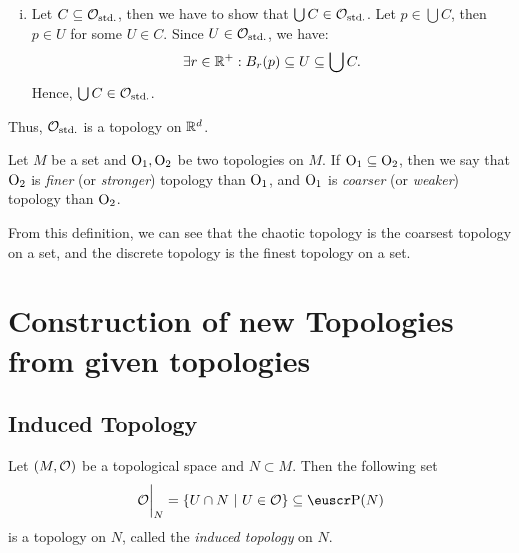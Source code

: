 \begin{example}
\begin{enumerate}[(i)]
		\item Let \(C \subseteq \mathcal{O}_{\text{std.}}\), then we have to show that \(\bigcup C\in\mathcal{O}_{\text{std.}}\). Let \(p \in \bigcup C\), then \(p \in U\) for some \(U \in C\). Since \(U \in \mathcal{O}_{\text{std.}}\), we have:
		      \begin{equation*}
			      \exists r \in \mathbb R^+ : B_r(p) \subseteq U \subseteq \bigcup C.
		      \end{equation*}
		      Hence, \(\bigcup C \in \mathcal{O}_{\text{std.}}\).
	\end{enumerate}
	Thus, \(\mathcal{O}_{\text{std.}}\) is a topology on \(\mathbb R^d\).
\end{example}

\begin{definition}
	Let \(M\) be a set and \(\mathrm{O}_1, \mathrm{O}_2\) be two topologies on \(M\). If \(\mathrm{O}_1 \subseteq \mathrm{O}_2\), then we say that \(\mathrm{O}_2\) is \emph{finer} (or \emph{stronger}) topology than \(\mathrm{O}_1\), and \(\mathrm{O}_1\) is \emph{coarser} (or \emph{weaker}) topology than \(\mathrm{O}_2\).
\end{definition}
From this definition, we can see that the chaotic topology is the coarsest topology on a set, and the discrete topology is the finest topology on a set.

\pagebreak
\section{Construction of new Topologies from given topologies}

\subsection{Induced Topology}
\begin{theorem}\label{thm:induced_topology}
	Let \((M, \mathcal{O})\) be a topological space and \(N \subset M\)\footnotemark. Then the following set
	\begin{equation}
		\eval{\CO}_N = \qty{U \cap N \mid U \in \CO} \subseteq \powerset(N) \label{eq:induced_topology}
	\end{equation}
	is a topology on \(N\), called the \emph{induced topology} on \(N\).
\end{theorem}

